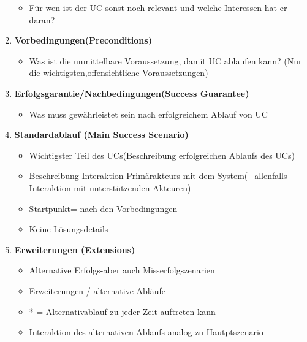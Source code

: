 \documentclass[../ZF_SWEN1.tex]{subfiles}
\begin{document}
\begin{enumerate}
\begin{large}
	\end{large}
	\begin{itemize}
		\item Für wen ist der UC sonst noch relevant und welche Interessen hat er daran?
	\end{itemize}
	\item \begin{large}
		\colorbox{teal!30}{\textbf{Vorbedingungen(Preconditions)}}
	\end{large}
	\begin{itemize}
		\item Was ist die unmittelbare Voraussetzung, damit UC ablaufen kann? (Nur die wichtigsten,offensichtliche Voraussetzungen)
	\end{itemize}
	\item 	
	\begin{large}
		\colorbox{teal!30}{\textbf{Erfolgsgarantie/Nachbedingungen(Success Guarantee)}}
	\end{large}
	\begin{itemize}
		\item Was muss gewährleistet sein nach erfolgreichem Ablauf von UC
	\end{itemize}
	\item 
	\begin{large}
		\colorbox{teal!30}{\textbf{Standardablauf (Main Success Scenario)}}
	\end{large}
	\begin{itemize}
		\item Wichtigster Teil des UCs(Beschreibung erfolgreichen Ablaufs des UCs)
		\item Beschreibung Interaktion Primärakteurs mit dem System(+allenfalls Interaktion mit unterstützenden Akteuren)
		\item Startpunkt= nach den Vorbedingungen
		\item Keine Lösungsdetails
	\end{itemize}
	\item 
	\begin{large}
		\colorbox{teal!30}{\textbf{Erweiterungen (Extensions)}}
	\end{large}
	\begin{itemize}
		\item Alternative Erfolgs-aber auch Misserfolgszenarien
		\item Erweiterungen / alternative Abläufe
		\item * = Alternativablauf zu jeder Zeit auftreten kann
		\item Interaktion des alternativen Ablaufs analog zu Hautptszenario

\end{itemize}
\end{enumerate}
\end{document}
